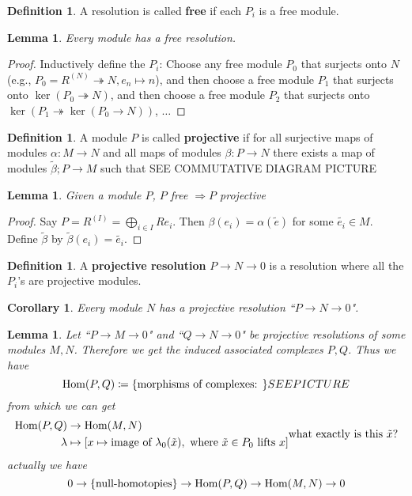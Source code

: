 \documentclass[12pt]{article}
\newcommand{\ho}[2]{\textup{Hom}(#1,#2)}
\newcommand{\mapp}[4]{\begin{align*}
#1 &\to #2\\
#3 & \mapsto #4
\end{align*}}
\newtheorem{corollary}[theorem]{Corollary}
\newtheorem{lemma}[theorem]{Lemma}
\theoremstyle{definition}
\newtheorem{definition}[theorem]{Definition}
\begin{document}
\begin{definition}
A resolution is called \textbf{free} if each $P_i$ is a free module.
\end{definition}
\begin{lemma}
Every module has a free resolution.
\end{lemma}
\begin{proof}
Inductively define the $P_i$: Choose any free module $P_0$ that surjects onto $N$ (e.g., $P_0 = R^{(N)} \twoheadrightarrow N, e_n\mapsto n$), and then choose a free module $P_1$ that surjects onto $\ker(P_0 \twoheadrightarrow N)$, and then choose a free module $P_2$ that surjects onto $\ker(P_1 \twoheadrightarrow \ker (P_0\rightarrow N))$, $\dots$
\end{proof}
\begin{definition}
A module $P$ is called \textbf{projective} if for all surjective maps of modules $\alpha: M \rightarrow N$ and all maps of modules $\beta:P\rightarrow  N$ there exists a map of modules $\tilde{\beta}; P \rightarrow M$ such that
SEE COMMUTATIVE DIAGRAM PICTURE
\end{definition}
\begin{lemma}
Given a module $P$, $P$ free $\Rightarrow P$ projective
\end{lemma}
\begin{proof}
Say $P = R^{(I)} = \bigoplus_{i\in I}Re_i$. Then $\beta(e_i) = \alpha(\tilde{e})$ for some $\tilde{e_i} \in M$. Define $\tilde{\beta}$ by $\tilde{\beta}(e_i)  = \tilde{e_i}$.
\end{proof}
\begin{definition}
A \textbf{projective resolution} $P\rightarrow N \rightarrow 0$ is a resolution where all the $P_i$'s are projective modules.
\end{definition}
\begin{corollary}
Every module $N$ has a projective resolution ``$P\rightarrow N \rightarrow 0$".
\end{corollary}
\begin{lemma}
Let ``$P \rightarrow M \rightarrow 0$" and ``$Q\rightarrow N \rightarrow 0$" be projective resolutions of some modules $M,N$. Therefore we get the induced associated complexes $P,Q$. Thus we have 
\[
\ho{P}{Q} \coloneqq \{\text{morphisms of complexes: }\} SEE PICTURE
\]
from which we can get 
\[
\mapp{\ho{P}{Q}}{\ho{M}{N}}{\lambda}{[x \mapsto \text{image of }\lambda_0(\tilde{x}),\text{ where }\tilde{x}\in P_0 \text{ lifts }x]} \text{what exactly is this $\tilde{x}$?}
\]
actually we have
\[
0 \rightarrow \{\text{null-homotopies}\} \rightarrow \ho{P}{Q} \rightarrow \ho{M}{N} \rightarrow 0
\]
\end{lemma}
\end{document}
